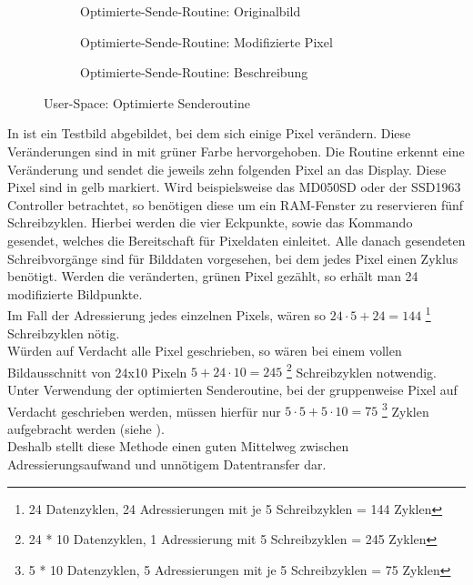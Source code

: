 \begin{figure}[htp]
        \begin{center}
        \begin{subfigure}[htp]{0.8\textwidth}
			\centering
			\caption{Optimierte-Sende-Routine: Originalbild}
			\label{fig:optimierte_routine_original}
		\end{subfigure}


        \begin{subfigure}[htp]{0.8\textwidth}
	\centering
{}
	\caption{Optimierte-Sende-Routine: Modifizierte Pixel}
	\label{fig:optimierte_routine_mod}
\end{subfigure}


        \begin{subfigure}[htp]{0.8\textwidth}
	\centering
{}
	\caption{Optimierte-Sende-Routine: Beschreibung}
	\label{fig:optimierte_routine_desc}
\end{subfigure}
		\end{center}
\caption{User-Space: Optimierte Senderoutine}
\end{figure}
In  ist ein Testbild abgebildet, bei dem sich einige Pixel verändern. Diese Veränderungen sind in  mit grüner Farbe hervorgehoben. Die Routine erkennt eine Veränderung und sendet die jeweils zehn folgenden Pixel an das Display. Diese Pixel sind in  gelb markiert. 
Wird beispielsweise das MD050SD oder der SSD1963 Controller betrachtet, so benötigen diese um ein RAM-Fenster zu reservieren fünf Schreibzyklen. Hierbei werden die vier Eckpunkte, sowie das Kommando gesendet, welches die Bereitschaft für Pixeldaten einleitet. Alle danach gesendeten Schreibvorgänge sind für Bilddaten vorgesehen, bei dem jedes Pixel einen Zyklus benötigt. Werden die veränderten, grünen Pixel gezählt, so erhält man 24 modifizierte Bildpunkte.\\
Im Fall der Adressierung jedes einzelnen Pixels, wären so $24 \cdot 5 + 24 = 144$ \footnote{24 Datenzyklen, 24 Adressierungen mit je 5 Schreibzyklen = 144 Zyklen} Schreibzyklen nötig. \\
Würden auf Verdacht alle Pixel geschrieben, so wären bei einem vollen Bildausschnitt von 24x10 Pixeln $5 + 24 \cdot 10 = 245$ \footnote{24 * 10 Datenzyklen, 1 Adressierung mit 5 Schreibzyklen = 245 Zyklen} Schreibzyklen notwendig. \\
Unter Verwendung der optimierten Senderoutine, bei der gruppenweise Pixel auf Verdacht geschrieben werden, müssen hierfür nur $5 \cdot 5 + 5 \cdot 10 = 75$ \footnote{5 * 10 Datenzyklen, 5 Adressierungen mit je 5 Schreibzyklen = 75 Zyklen} Zyklen aufgebracht werden (siehe \citep{Schlegel2013a}).\\ Deshalb stellt diese Methode einen guten Mittelweg zwischen Adressierungsaufwand und unnötigem Datentransfer dar. 
